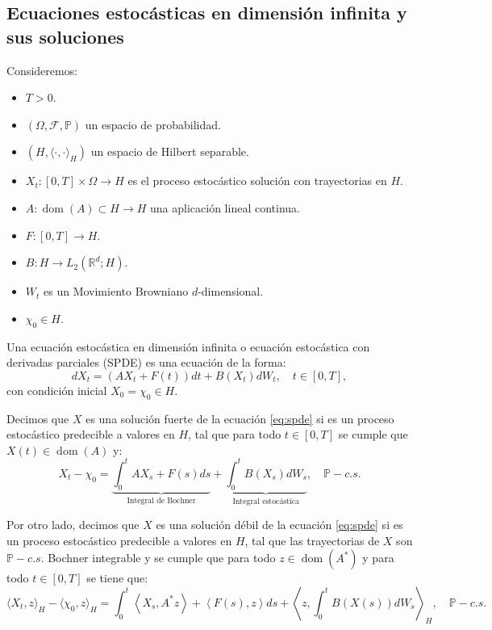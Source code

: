\subsection{Ecuaciones estocásticas en dimensión infinita y sus soluciones}

Consideremos:
\vspace{-1em}
\begin{itemize}
  \item $T > 0$.
  \item $(\Omega, \mathcal{F}, \mathbb{P})$ un espacio de probabilidad.
  \item $(H, \langle\cdot, \cdot\rangle_H)$ un espacio de Hilbert separable.
  \item $X_t: [0, T] \times \Omega \to H$ es el proceso estocástico solución con trayectorias en $H$.
  \item $A: \operatorname{ dom }(A) \subset H \to H$ una aplicación lineal continua.
  \item $F: [0, T] \rightarrow H$.
  \item $B: H \to L_2(\mathbb{R}^d; H)$.
  \item $W_t$ es un Movimiento Browniano $d$-dimensional.
  \item $\chi_0 \in H$.
\end{itemize}

\begin{defn}
  Una ecuación estocástica en dimensión infinita o ecuación estocástica con derivadas parciales (SPDE) es una ecuación de la forma:
  \begin{equation}\label{eq:spde}
    d X_t = (A X_t + F(t))dt + B(X_t) d W_t, \quad t \in [0, T],
  \end{equation}
  con condición inicial $X_0 = \chi_0 \in H$.

  Decimos que $X$ es una solución fuerte de la ecuación \eqref{eq:spde} si es un proceso estocástico predecible a valores en $H$, tal que para todo $t \in [0, T]$ se cumple que $X(t) \in \operatorname{ dom }(A)$ y:
  \begin{equation}\label{eq:spde_strong_sol}
    X_t - \chi_0 = \underbrace{\int_0^t AX_s + F(s) ds}_{\text{Integral de Bochner}} + \underbrace{\int^t_0 B(X_s)dW_s}_{\text{Integral estocástica}}, \quad \mathbb{P}-c.s.
  \end{equation}

  Por otro lado, decimos que $X$ es una solución débil de la ecuación \eqref{eq:spde} si es un proceso estocástico predecible a valores en $H$, tal que las trayectorias de $X$ son $\mathbb{P}-c.s.$ Bochner integrable y se cumple que para todo $z \in \operatorname{ dom }(A^*)$ y para todo $t \in [0, T]$ se tiene que:
  \begin{equation}\label{eq:spde_weak_sol}
    \langle X_t, z \rangle_H - \langle \chi_0, z \rangle_H = \int_0^t \left\langle X_s , A^* z\right\rangle + \left\langle F(s), z\right\rangle ds  +  \left\langle z, \int^t_0 B(X(s)) dW_s\right\rangle_H, \quad \mathbb{P}-c.s.
  \end{equation}
\end{defn}

